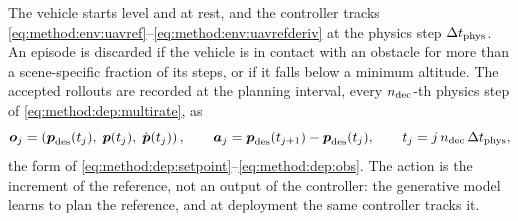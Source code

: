 The vehicle starts level and at rest, and the controller tracks
\eqref{eq:method:env:uavref}--\eqref{eq:method:env:uavrefderiv} at the physics step $\Delta t_{\textrm{phys}}$. An episode is discarded if the vehicle is in
contact with an obstacle for more than a scene-specific fraction of its steps, or if it falls below a
minimum altitude. The accepted rollouts are recorded at the planning interval, every $n_{\textrm{dec}}$-th
physics step of \eqref{eq:method:dep:multirate}, as
\begin{equation}\label{eq:method:env:uavdata}
  \boldsymbol{o}_{j} = \left(\boldsymbol{p}_{\textrm{des}}(t_{j}),\;\boldsymbol{p}(t_{j}),\;\dot{\boldsymbol{p}}(t_{j})\right),
  \qquad
  \boldsymbol{a}_{j} = \boldsymbol{p}_{\textrm{des}}(t_{j+1}) - \boldsymbol{p}_{\textrm{des}}(t_{j}),
  \qquad
  t_{j} = j\,n_{\textrm{dec}}\,\Delta t_{\textrm{phys}},
\end{equation}
the form of \eqref{eq:method:dep:setpoint}--\eqref{eq:method:dep:obs}. The action is the increment of
the reference, not an output of the controller: the generative model learns to plan the reference,
and at deployment the same controller tracks it.


